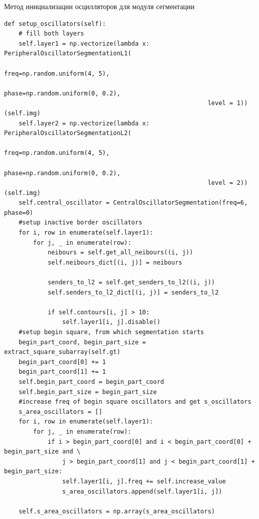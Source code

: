\documentclass[14pt, russian]{scrartcl}
\begin{document}
\begin{listing}[!htt]
    \caption{Метод инициализации осцилляторов для модуля сегментации}
    \label{lst:contour_extr_sobel}
    \begin{verbatim}
def setup_oscillators(self):
    # fill both layers
    self.layer1 = np.vectorize(lambda x: PeripheralOscillatorSegmentationL1(
                                                        freq=np.random.uniform(4, 5),
                                                        phase=np.random.uniform(0, 0.2),
                                                        level = 1))(self.img)
    self.layer2 = np.vectorize(lambda x: PeripheralOscillatorSegmentationL2(
                                                        freq=np.random.uniform(4, 5),
                                                        phase=np.random.uniform(0, 0.2),
                                                        level = 2))(self.img)
    self.central_oscillator = CentralOscillatorSegmentation(freq=6, phase=0)
    #setup inactive border oscillators
    for i, row in enumerate(self.layer1):
        for j, _ in enumerate(row):
            neibours = self.get_all_neibours((i, j))
            self.neibours_dict[(i, j)] = neibours

            senders_to_l2 = self.get_senders_to_l2((i, j))
            self.senders_to_l2_dict[(i, j)] = senders_to_l2

            if self.contours[i, j] > 10:
                self.layer1[i, j].disable()
    #setup begin square, from which segmentation starts
    begin_part_coord, begin_part_size = extract_square_subarray(self.gt)
    begin_part_coord[0] += 1
    begin_part_coord[1] += 1
    self.begin_part_coord = begin_part_coord
    self.begin_part_size = begin_part_size
    #increase freq of begin square oscillators and get s_oscillators
    s_area_oscillators = []
    for i, row in enumerate(self.layer1):
        for j, _ in enumerate(row):
            if i > begin_part_coord[0] and i < begin_part_coord[0] + begin_part_size and \
                j > begin_part_coord[1] and j < begin_part_coord[1] + begin_part_size:
                self.layer1[i, j].freq += self.increase_value
                s_area_oscillators.append(self.layer1[i, j])

    self.s_area_oscillators = np.array(s_area_oscillators)
    \end{verbatim}
\end{listing}
\end{document}
